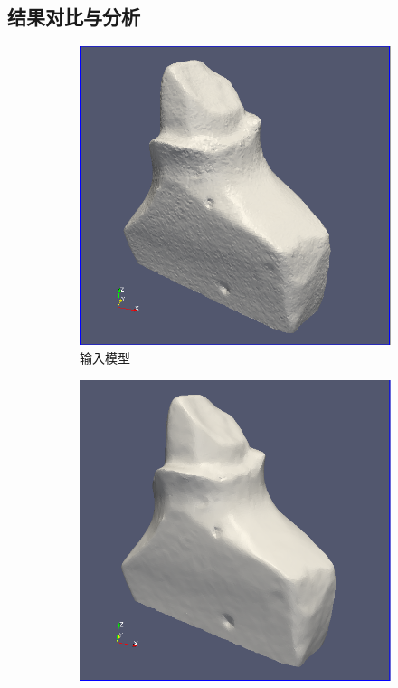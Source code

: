 \documentclass{article}
\theoremstyle{definition}
\theoremstyle{remark}
\begin{document}
\subsection{结果对比与分析}
\begin{figure}[H]
  	\begin{subfigure}[b]{0.5\textwidth}
        \includegraphics[width=\textwidth]{input_1}
        \caption[input]{输入模型}
        \end{subfigure}
        \begin{subfigure}[b]{0.5\textwidth}
        \includegraphics[width=\textwidth]{basic_1}

\end{subfigure}
\end{figure}
\end{document}
